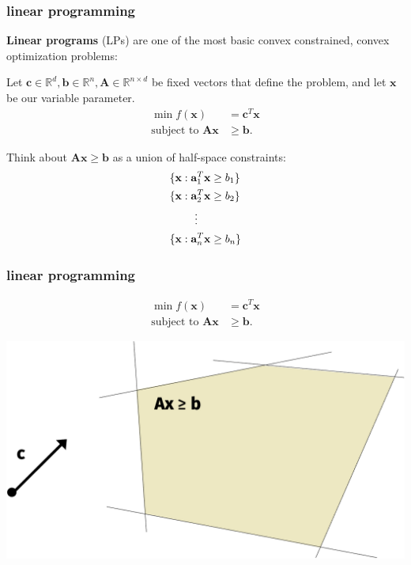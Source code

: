 \documentclass[compress]{beamer}
\newcommand{\bv}[1]{\mathbf{#1}}
\newcommand{\R}{\mathbb{R}}
\begin{document}
\begin{frame}[t]
	\frametitle{linear programming}
	\textbf{Linear programs} (LPs) are one of the most basic convex constrained, convex optimization problems:
	
	Let $\bv{c}\in \R^d, \bv{b}\in \R^n, \bv{A}\in \R^{n\times d}$ be fixed vectors that define the problem, and let $\bv{x}$ be our variable parameter.
	\begin{align*}
	\min f(\bv{x}) &= \bv{c}^T\bv{x}\\
	\text{subject to } \bv{A}\bv{x} &\geq \bv{b}.
	\end{align*}
	
Think about $\bv{A}\bv{x} \geq \bv{b}$ as a union of half-space constraints:
\begin{align*}
	&\{\bv{x}: \bv{a}_1^T\bv{x} \geq {b}_1 \}\\
		&\{\bv{x}: \bv{a}_2^T\bv{x} \geq {b}_2 \}\\
			&\hspace{2.3em}\vdots\\
			&\{\bv{x}: \bv{a}_n^T\bv{x} \geq {b}_n \}
\end{align*}
	
\end{frame}

\begin{frame}[t]
	\frametitle{linear programming}
	\begin{align*}
		\min f(\bv{x}) &= \bv{c}^T\bv{x}\\
		\text{subject to } \bv{A}\bv{x} &\geq \bv{b}.
	\end{align*}
	
	\begin{center}
		\includegraphics[width=.8\textwidth]{lpexample.png}
	\end{center}
\end{frame}
\end{document}
